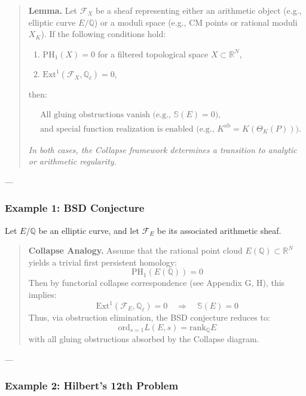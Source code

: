 \documentclass[11pt]{article}
\newcommand{\Sha}{\mathbb{S}}
\begin{document}
\begin{axiom}
\begin{axiom}
{{\begin{quote}
\textbf{Lemma.}  
Let \( \mathcal{F}_X \) be a sheaf representing either an arithmetic object (e.g., elliptic curve \( E/\mathbb{Q} \))  
or a moduli space (e.g., CM points or rational moduli \( X_K \)).  
If the following conditions hold:

\begin{enumerate}
  \item \( \mathrm{PH}_1(X) = 0 \) for a filtered topological space \( X \subset \mathbb{R}^N \),
  \item \( \mathrm{Ext}^1(\mathcal{F}_X, \mathbb{Q}_\ell) = 0 \),
\end{enumerate}

then:

\[
\begin{aligned}
& \text{All gluing obstructions vanish (e.g., } \Sha(E) = 0 \text{),} \\
& \text{and special function realization is enabled (e.g., } 
K^{\mathrm{ab}} = K(\Theta_K(P)) \text{).}
\end{aligned}
\]

\textit{In both cases, the Collapse framework determines a transition to analytic or arithmetic regularity.}
\end{quote}

---

\subsubsection*{Example 1: BSD Conjecture}

Let \( E/\mathbb{Q} \) be an elliptic curve, and let \( \mathcal{F}_E \) be its associated arithmetic sheaf.

\begin{quote}
\textbf{Collapse Analogy.}  
Assume that the rational point cloud \( E(\mathbb{Q}) \subset \mathbb{R}^N \)  
yields a trivial first persistent homology:
\[
\mathrm{PH}_1(E(\mathbb{Q})) = 0
\]
Then by functorial collapse correspondence (see Appendix G, H), this implies:
\[
\mathrm{Ext}^1(\mathcal{F}_E, \mathbb{Q}_\ell) = 0 \quad \Rightarrow \quad \Sha(E) = 0
\]
Thus, via obstruction elimination, the BSD conjecture reduces to:
\[
\mathrm{ord}_{s=1} L(E,s) = \mathrm{rank}_{\mathbb{Q}} E
\]
with all gluing obstructions absorbed by the Collapse diagram.
\end{quote}

---

\subsubsection*{Example 2: Hilbert’s 12th Problem}

}}
\end{axiom}
\end{axiom}
\end{document}
